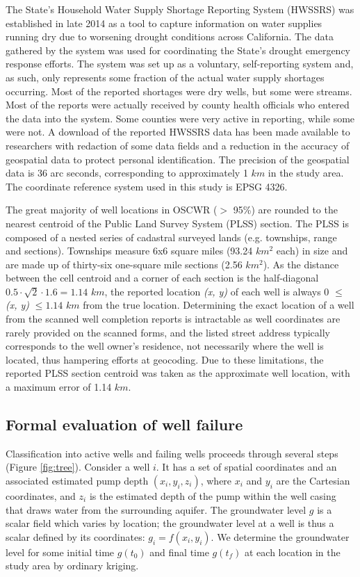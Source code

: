 The State’s Household Water Supply Shortage Reporting System (HWSSRS) was established in late 2014 as a tool to capture information on water supplies running dry due to worsening drought conditions across California. The data gathered by the system was used for coordinating the State’s drought emergency response efforts.  The system was set up as a voluntary, self-reporting system and, as such, only represents some fraction of the actual water supply shortages occurring. Most of the reported shortages were dry wells, but some were streams. Most of the reports were actually received by county health officials who entered the data into the system. Some counties were very active in reporting, while some were not. A download of the reported HWSSRS data has been made available to researchers with redaction of some data fields and a reduction in the accuracy of geospatial data to protect personal identification. The precision of the geospatial data is 36 arc seconds, corresponding to approximately 1 $km$ in the study area. The coordinate reference system used in this study is EPSG 4326.  

The great majority of well locations in OSCWR ($>$ 95\%) are rounded to the nearest centroid of the Public Land Survey System (PLSS) section. The PLSS is composed of a nested series of cadastral surveyed lands (e.g. townships, range and sections). Townships measure 6x6 square miles (93.24 $km^2$ each) in size and are made up of thirty-six one-square mile sections (2.56 $km^2$). As the distance between the cell centroid and a corner of each section is the half-diagonal $0.5\cdot\sqrt{2}\cdot1.6 = 1.14$ $km$, the reported location \textit{(x, y)} of each well is always 0 $\leq$ \textit{(x, y)}  $\leq 1.14$ $km$ from the true location. Determining the exact location of a well from the scanned well completion reports is intractable as well coordinates are rarely provided on the scanned forms, and the listed street address typically corresponds to the well owner's residence, not necessarily where the well is located, thus hampering efforts at geocoding. Due to these limitations, the reported PLSS section centroid was taken as the approximate well location, with a maximum error of 1.14 $km$.

\subsection{Formal evaluation of well failure}
\label{ap_a_formal_wf}

Classification into active wells and failing wells proceeds through several steps (Figure \ref{fig:tree}). Consider a well $i$. It has a set of spatial coordinates and an associated estimated pump depth $(x_i,y_i,z_i)$, where $x_i$ and $y_i$ are the Cartesian coordinates, and $z_i$ is the estimated depth of the pump within the well casing that draws water from the surrounding aquifer. The groundwater level $g$ is a scalar field which varies by location; the groundwater level at a well is thus a scalar defined by its coordinates: $g_i = f(x_i,y_i)$. We determine the groundwater level for some initial time $g({t_0})$ and final time $g({t_f})$ at each location in the study area by ordinary kriging.  

